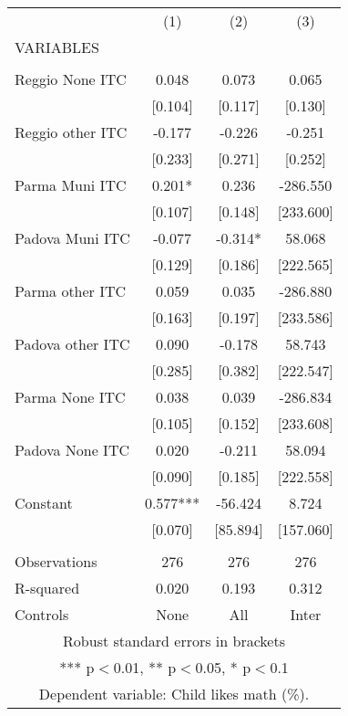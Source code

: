 \begin{tabular}{lccc} \hline
 & (1) & (2) & (3) \\
VARIABLES &  &  &  \\ \hline
 &  &  &  \\
Reggio None ITC & 0.048 & 0.073 & 0.065 \\
 & [0.104] & [0.117] & [0.130] \\
Reggio other ITC & -0.177 & -0.226 & -0.251 \\
 & [0.233] & [0.271] & [0.252] \\
Parma Muni ITC & 0.201* & 0.236 & -286.550 \\
 & [0.107] & [0.148] & [233.600] \\
Padova Muni ITC & -0.077 & -0.314* & 58.068 \\
 & [0.129] & [0.186] & [222.565] \\
Parma other ITC & 0.059 & 0.035 & -286.880 \\
 & [0.163] & [0.197] & [233.586] \\
Padova other ITC & 0.090 & -0.178 & 58.743 \\
 & [0.285] & [0.382] & [222.547] \\
Parma None ITC & 0.038 & 0.039 & -286.834 \\
 & [0.105] & [0.152] & [233.608] \\
Padova None ITC & 0.020 & -0.211 & 58.094 \\
 & [0.090] & [0.185] & [222.558] \\
Constant & 0.577*** & -56.424 & 8.724 \\
 & [0.070] & [85.894] & [157.060] \\
 &  &  &  \\
Observations & 276 & 276 & 276 \\
R-squared & 0.020 & 0.193 & 0.312 \\
 Controls & None & All & Inter \\ \hline
\multicolumn{4}{c}{ Robust standard errors in brackets} \\
\multicolumn{4}{c}{ *** p$<$0.01, ** p$<$0.05, * p$<$0.1} \\
\multicolumn{4}{c}{ Dependent variable: Child likes math (\%).} \\
\end{tabular}
